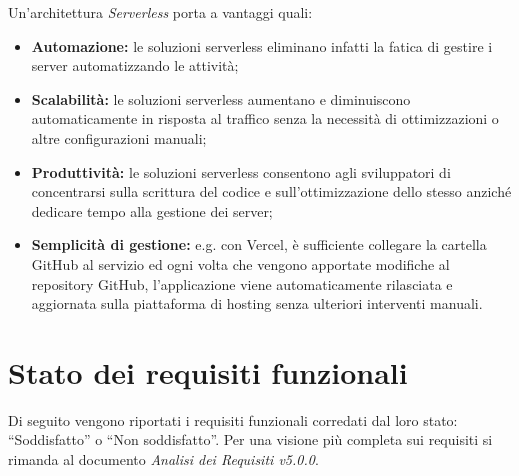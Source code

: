 \noindent Un'architettura \textit{Serverless} porta a vantaggi quali:
\begin{itemize}
    \item \textbf{Automazione:} le soluzioni serverless eliminano infatti la fatica di gestire i server automatizzando le attività;
    \item \textbf{Scalabilità:} le soluzioni serverless aumentano e diminuiscono automaticamente in risposta al traffico senza la necessità di ottimizzazioni o altre configurazioni manuali;
    \item \textbf{Produttività:} le soluzioni serverless consentono agli sviluppatori di concentrarsi sulla scrittura del codice e sull'ottimizzazione dello stesso anziché dedicare tempo alla gestione dei server;
    \item \textbf{Semplicità di gestione:} e.g. con Vercel, è sufficiente collegare la cartella GitHub al servizio ed ogni volta che vengono apportate modifiche al repository GitHub, l'applicazione viene automaticamente rilasciata e aggiornata sulla piattaforma di hosting senza ulteriori interventi manuali.
\end{itemize}


\section{Stato dei requisiti funzionali}\label{sec:requisiti}
Di seguito vengono riportati i requisiti funzionali corredati dal loro stato: ``Soddisfatto'' o ``Non soddisfatto''.
Per una visione più completa sui requisiti si rimanda al documento \textit{Analisi dei Requisiti v5.0.0}.

